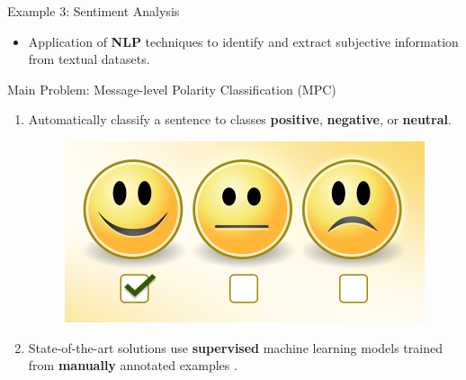 \documentclass[handout]{beamer}
\begin{document}
\begin{frame}{Example 3: Sentiment Analysis}
\begin{scriptsize}\begin{itemize}
 \item Application of \textbf{NLP} techniques to identify and extract subjective information from textual datasets.
\end{itemize}

\begin{block}{Main Problem: Message-level Polarity Classification (MPC)}
  \begin{enumerate}
   \item Automatically classify a sentence to classes \textcolor[rgb]{0.00,0.00,1.00}{\textbf{positive}}, \textcolor[rgb]{1.00,0.00,0.00}{\textbf{negative}}, or \textcolor[rgb]{0.00,1.00,0.00}{\textbf{neutral}}. 
   
     \begin{figure}[h]
        	\includegraphics[scale = 0.15]{pics/sent.png}
        \end{figure}
   
   \item State-of-the-art solutions use \textbf{supervised} machine learning models trained from \textbf{manually} annotated examples \cite{Mohammad2013}.
  \end{enumerate} 
\end{block}

\end{scriptsize}

\end{frame}
\end{document}
